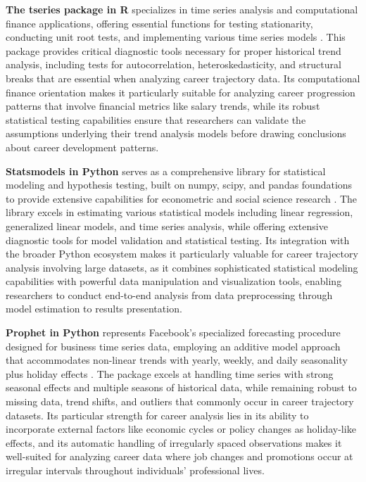 \documentclass[../main.tex]{subfiles}
\begin{document}
\textbf{The tseries package in R} specializes in time series analysis and computational finance applications, offering essential functions for testing stationarity, conducting unit root tests, and implementing various time series models \parencite{cran2023}. This package provides critical diagnostic tools necessary for proper historical trend analysis, including tests for autocorrelation, heteroskedasticity, and structural breaks that are essential when analyzing career trajectory data. Its computational finance orientation makes it particularly suitable for analyzing career progression patterns that involve financial metrics like salary trends, while its robust statistical testing capabilities ensure that researchers can validate the assumptions underlying their trend analysis models before drawing conclusions about career development patterns.

\textbf{Statsmodels in Python} serves as a comprehensive library for statistical modeling and hypothesis testing, built on numpy, scipy, and pandas foundations to provide extensive capabilities for econometric and social science research \parencite{codecademy2023}. The library excels in estimating various statistical models including linear regression, generalized linear models, and time series analysis, while offering extensive diagnostic tools for model validation and statistical testing. Its integration with the broader Python ecosystem makes it particularly valuable for career trajectory analysis involving large datasets, as it combines sophisticated statistical modeling capabilities with powerful data manipulation and visualization tools, enabling researchers to conduct end-to-end analysis from data preprocessing through model estimation to results presentation.

\textbf{Prophet in Python} represents Facebook's specialized forecasting procedure designed for business time series data, employing an additive model approach that accommodates non-linear trends with yearly, weekly, and daily seasonality plus holiday effects \parencite{pypi2023}. The package excels at handling time series with strong seasonal effects and multiple seasons of historical data, while remaining robust to missing data, trend shifts, and outliers that commonly occur in career trajectory datasets. Its particular strength for career analysis lies in its ability to incorporate external factors like economic cycles or policy changes as holiday-like effects, and its automatic handling of irregularly spaced observations makes it well-suited for analyzing career data where job changes and promotions occur at irregular intervals throughout individuals' professional lives.
\end{document}

